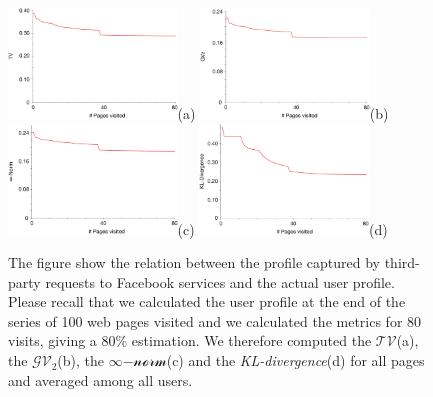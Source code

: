 \begin{figure}
{\includegraphics[width=0.4\textwidth]{figures/facebook-tracking-page-norm-1.eps}(a)
\includegraphics[width=0.4\textwidth]{figures/facebook-tracking-page-norm-2.eps}(b)}
{\includegraphics[width=0.4\textwidth]{figures/facebook-tracking-page-norm-inf.eps}(c)
\includegraphics[width=0.4\textwidth]{figures/facebook-tracking-page-kl.eps}(d)}

\caption[How Facebook track the user's profile]{The figure show the relation between the profile captured by third-party requests to Facebook services and the actual user profile. Please recall that we calculated the user profile at the end of the series of 100 web pages visited and we calculated the metrics for 80 visits, giving a 80\% estimation.%
We therefore computed the $\mathcal{TV}$(a), the $\mathcal{GV_2}$(b), the $\infty\mathcal{-norm}$(c) and the \emph{KL-divergence}(d) for all pages and averaged among all users.
\label{fig:average-facebook-pages-tracker}}%
\end{figure}

